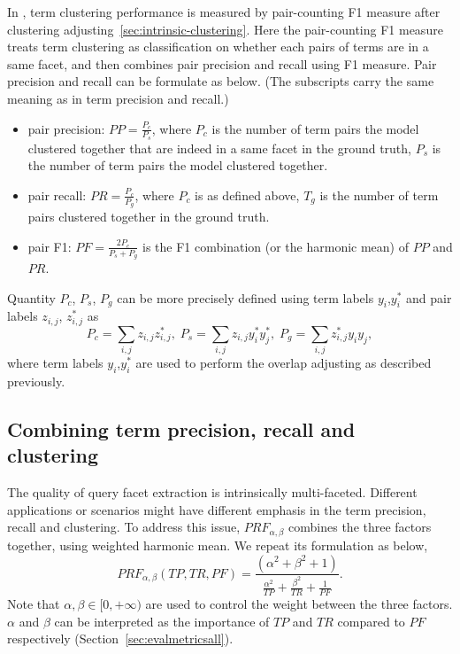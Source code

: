 In \PRF, term clustering performance is measured by pair-counting F1 measure after clustering adjusting~\ref{sec:intrinsic-clustering}. Here the pair-counting F1 measure treats term clustering as classification on whether each pairs of terms are in a same facet, and then combines pair precision and recall using F1 measure. Pair precision and recall can be formulate as below. (The subscripts carry the same meaning as in term precision and recall.)
\begin{itemize}
 \item pair precision: $P\!P = \frac{P_c}{P_s}$, where $P_c$ is the number of term pairs the model clustered together that are indeed in a same facet in the ground truth, $P_s$ is the number of term pairs the model clustered together. 
 \item pair recall: $P\!R = \frac{P_c}{P_g}$, where $P_c$ is as defined above, $T_g$ is the number of term pairs clustered together in the ground truth.
 \item pair F1: $P\!F=\frac{2P_c}{P_s+P_g}$ is the F1 combination (or the harmonic mean) of $P\!P$ and $P\!R$.
\end{itemize}
Quantity $P_c$, $P_s$, $P_g$ can be more precisely defined using term labels $y_i$,$y_i^{*}$ and pair labels $z_{i,j}$, $z_{i,j}^{*}$ as
\begin{equation}
\label{eq:qpair}
 P_c=\sum_{i,j}{z_{i,j}z_{i,j}^{*}}, \; P_s=\sum_{i,j}{z_{i,j}}y_i^*y_j^*, \; P_g=\sum_{i,j}{z_{i,j}^*}y_iy_j,
\end{equation}
where term labels $y_i$,$y_i^{*}$ are used to perform the overlap adjusting as described previously.

\subsection{Combining term precision, recall and clustering}
The quality of query facet extraction is intrinsically multi-faceted. Different applications or scenarios might have different emphasis in the term precision, recall and clustering. To address this issue, $P\!R\!F_{\alpha,\beta}$ combines the three factors together, using weighted harmonic mean. We repeat its formulation as below,
\begin{equation}
\label{eq:prf2}
 P\!R\!F_{\alpha,\beta}(T\!P, T\!R, P\!F) = \frac{(\alpha^2 + \beta^2 + 1)}{\frac{\alpha^2}{T\!P} + \frac{\beta^2}{T\!R} + \frac{1}{P\!F}}.
\end{equation}
Note that $\alpha,\beta \in [0,+\infty)$ are used to control the weight between the three factors. $\alpha$ and $\beta$ can be interpreted as the importance of $T\!P$ and $T\!R$ compared to $P\!F$ respectively (Section~\ref{sec:evalmetricsall}).

